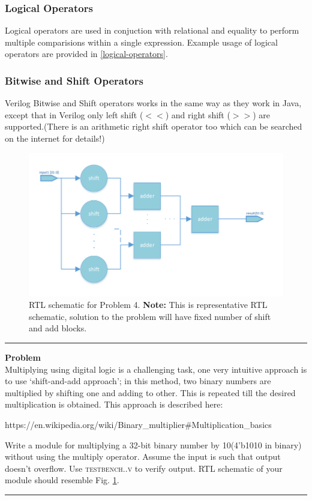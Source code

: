 \documentclass[a4paper,10pt]{article}
\newcommand{\ano}{\text{1}}
\theoremstyle{mytheor}
\newcommand{
  \insertverilog}[3]{
  
}
\newcounter{problemNumber}
\newcommand {
  \insertProblem}[1]{
  \vspace{0.5cm}
  \hrule
  \vspace{0.3cm}

  {\color{greatblue}\textbf{\large{Problem \theproblemNumber}}}
  \vspace{2pt}\\#1

  \addtocounter{problemNumber}{1}
  \vspace{0.2cm}
  \hrule  
  \vspace{0.5cm}
}
\begin{document}
\subsubsection*{Logical Operators}
Logical operators are used in conjuction with relational and equality
to perform multiple comparisions within a single expression.
Example usage of logical operators are provided in \ref{logical-operators}.
\insertverilog{./verilog_files/logicalOperators.v}{logical-operators}{\text{Functioning of logical operator}}

\subsubsection*{Bitwise and Shift Operators}
Verilog Bitwise and Shift operators works in the same way as they work
in Java, except that in Verilog only left shift (\textbf{$<<$}) and right shift
(\textbf{$>>$}) are supported.(There is an arithmetic right shift operator too which can be searched on the internet for details!)

\begin{figure}[!h] \centering  
  \includegraphics[width=0.9\linewidth]{./resources/shift_and_add_representation.pdf}
  \caption{RTL schematic for Problem 4. \textbf{Note:} This is representative RTL schematic, solution to the problem will have fixed number of shift and add blocks.} 
  \label{Fig:problem-4-RTL} 
\end{figure}    

\insertProblem {
  Multiplying using digital logic is a challenging task, one very intuitive approach is to use `shift-and-add approach'; in this method, two binary numbers are multiplied by shifting one and adding to other. This is repeated till the desired multiplication is obtained. This approach is described here: \begin{center}https://en.wikipedia.org/wiki/Binary\_multiplier\#Multiplication\_basics\end{center} 
  
    Write a module for multiplying a 32-bit binary number by 10(4'b1010 in binary) without using the multiply operator. Assume the input is such that output doesn't overflow. Use \textsc{testbench{\ano}.{\theproblemNumber}.v} to verify output. RTL schematic of your module should resemble Fig. \ref{Fig:problem-4-RTL}.
}
\end{document}
